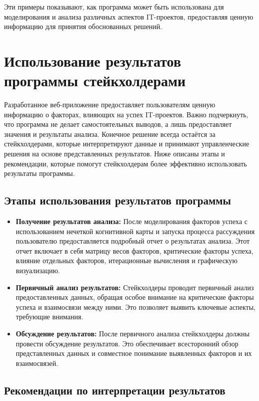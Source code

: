 \documentclass{article}
\begin{document}
    Эти примеры показывают, как программа может быть использована для моделирования и анализа различных аспектов IT-проектов, предоставляя ценную информацию для принятия обоснованных решений.

    \section{Использование результатов программы стейкхолдерами}

    Разработанное веб-приложение предоставляет пользователям ценную информацию о факторах, влияющих на успех IT-проектов. Важно подчеркнуть, что программа не делает самостоятельных выводов, а лишь предоставляет значения и результаты анализа. Конечное решение всегда остаётся за стейкхолдерами, которые интерпретируют данные и принимают управленческие решения на основе представленных результатов. Ниже описаны этапы и рекомендации, которые помогут стейкхолдерам более эффективно использовать результаты программы.

    \subsection{Этапы использования результатов программы}

    \begin{itemize}
        \item \textbf{Получение результатов анализа:}
        После моделирования факторов успеха с использованием нечеткой когнитивной карты и запуска процесса рассуждения пользователю предоставляется подробный отчет о результатах анализа. Этот отчет включает в себя матрицу весов факторов, критические факторы успеха, влияние отдельных факторов, итерационные вычисления и графическую визуализацию.
        \item \textbf{Первичный анализ результатов:}
        Стейкхолдеры проводит первичный анализ предоставленных данных, обращая особое внимание на критические факторы успеха и взаимосвязи между ними. Это позволяет выявить ключевые аспекты, требующие внимания.
        \item \textbf{Обсуждение результатов:}
        После первичного анализа стейкхолдеры должны провести обсуждение результатов. Это обеспечивает всесторонний обзор представленных данных и совместное понимание выявленных факторов и их взаимосвязей.
    \end{itemize}

    \subsection{Рекомендации по интерпретации результатов}
\end{document}
